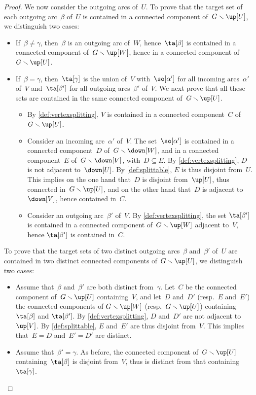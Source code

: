 \documentclass{amsart}
\theoremstyle{definition}
\newcommand{\ssm}{\smallsetminus} %
\begin{document}
\begin{proof}
  We now consider the outgoing arcs of~$U$.
  To prove that the target set of each outgoing arc~$\beta$ of~$U$ is contained in a connected component of~$G \ssm \up[U]$, we distinguish two cases:
  \begin{itemize}
    \item If~$\beta \ne \gamma$, then~$\beta$ is an outgoing arc of~$W$, hence~$\ta[\beta]$ is contained in a connected component of~$G \ssm \up[W]$, hence in a connected component of~$G \ssm \up[U]$.
    \item If~$\beta = \gamma$, then~$\ta[\gamma]$ is the union of~$V$ with~$\so[\alpha']$ for all incoming arcs~$\alpha'$ of~$V$ and~$\ta[\beta']$ for all outgoing arcs~$\beta'$ of~$V$. We next prove that all these sets are contained in the same connected component of~$G \ssm \up[U]$.
    \begin{itemize}
      \item By \cref{def:vertexsplitting}, $V$ is contained in a connected component~$C$ of~$G \ssm \up[U]$. 
      \item Consider an incoming arc~$\alpha'$ of~$V$. The set~$\so[\alpha']$ is contained in a connected component~$D$ of~$G \ssm \down[W]$, and in a connected component~$E$ of~$G \ssm \down[V]$, with~$D \subseteq E$. By \cref{def:vertexsplitting}, $D$ is not adjacent to~$\down[U]$. By \cref{def:splittable}, $E$ is thus disjoint from~$U$. This implies on the one hand that~$D$ is disjoint from~$\up[U]$, thus connected in~$G \ssm \up[U]$, and on the other hand that~$D$ is adjacent to~$\down[V]$, hence contained in~$C$. 
      \item Consider an outgoing arc~$\beta'$ of~$V$. By \cref{def:vertexsplitting}, the set $\ta[\beta']$ is contained in a connected component of~$G \ssm \up[W]$ adjacent to~$V$, hence $\ta[\beta']$ is contained in~$C$.
    \end{itemize}
  \end{itemize}
  To prove that the target sets of two distinct outgoing arcs~$\beta$ and~$\beta'$ of~$U$ are contained in two distinct connected components of~$G \ssm \up[U]$, we distinguish two cases:
  \begin{itemize}
  \item Assume that~$\beta$ and~$\beta'$ are both distinct from~$\gamma$. Let~$C$ be the connected component of~$G \ssm \up[U]$ containing~$V$, and let~$D$ and~$D'$ (resp.~$E$ and~$E'$) the connected components of $G \ssm \up[W]$ (resp.~$G \ssm \up[U]$) containing~$\ta[\beta]$ and $\ta[\beta']$. By \cref{def:vertexsplitting}, $D$ and~$D'$ are not adjacent to~$\up[V]$. By \cref{def:splittable}, $E$ and~$E'$ are thus disjoint from~$V$. This implies that~$E = D$ and~$E' = D'$ are distinct.
  \item Assume that~$\beta' = \gamma$. As before, the connected component of~$G \ssm \up[U]$ containing~$\ta[\beta]$ is disjoint from~$V$, thus is distinct from that containing~$\ta[\gamma]$.
  \qedhere
  \end{itemize}
\end{proof}
\end{document}
